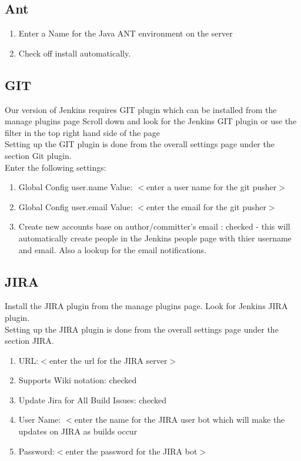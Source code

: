 \subsection {Ant}
\begin{enumerate}
\item Enter a Name for the Java ANT environment on the server
\item Check off install automatically.
\end{enumerate}

\subsection{GIT}
Our version of Jenkins requires GIT plugin which can be installed from the manage plugins page
Scroll down and look for the Jenkins GIT plugin  or use the filter in the top right hand side of the page\\

Setting up the GIT plugin is done from the overall settings page under the section Git plugin.\\

Enter the following settings:
\begin{enumerate}
\item Global Config user.name Value: $<$enter a user name for the git pusher$>$
\item Global Config user.email Value: $<$enter the email for the git pusher$>$
\item Create new accounts base on author/committer's email : checked - this will automatically create people in the Jenkins people page with thier username and email. Also a lookup for the email notifications.
\end{enumerate}
\subsection{JIRA}

Install the JIRA plugin from the manage plugins page. Look for Jenkins JIRA plugin.\\
Setting up the JIRA plugin is done from the overall settings page under the section JIRA.\\
\begin{enumerate}
\item URL:$<$enter the url for the JIRA server$>$
\item Supports Wiki notation: checked
\item Update Jira for All Build Issues: checked
\item User Name: $<$enter the name for the JIRA user bot which will make the updates on JIRA as builds occur
\item Password:$<$enter the password for the JIRA bot$>$
\end{enumerate}


